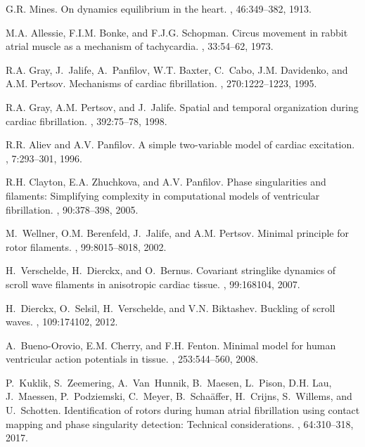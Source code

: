\documentclass{article}
\begin{document}
\begin{thebibliography}{10}

G.R. Mines.
\newblock On dynamics equilibrium in the heart.
, 46:349--382, 1913.

M.A. Allessie, F.I.M. Bonke, and F.J.G. Schopman.
\newblock Circus movement in rabbit atrial muscle as a mechanism of
  tachycardia.
, 33:54--62, 1973.

R.A. Gray, J.~Jalife, A.~Panfilov, W.T. Baxter, C.~Cabo, J.M. Davidenko, and
  A.M. Pertsov.
\newblock Mechanisms of cardiac fibrillation.
, 270:1222--1223, 1995.

R.A. Gray, A.M. Pertsov, and J.~Jalife.
\newblock Spatial and temporal organization during cardiac fibrillation.
, 392:75--78, 1998.

R.R. Aliev and A.V. Panfilov.
\newblock A simple two-variable model of cardiac excitation.
, 7:293--301, 1996.

R.H. Clayton, E.A. Zhuchkova, and A.V. Panfilov.
\newblock Phase singularities and filaments: Simplifying complexity in
  computational models of ventricular fibrillation.
, 90:378--398, 2005.

M.~Wellner, O.M. Berenfeld, J.~Jalife, and A.M. Pertsov.
\newblock Minimal principle for rotor filaments.
, 99:8015--8018, 2002.

H.~Verschelde, H.~Dierckx, and O.~Bernus.
\newblock Covariant stringlike dynamics of scroll wave filaments in anisotropic
  cardiac tissue.
, 99:168104, 2007.

H.~Dierckx, O.~Selsil, H.~Verschelde, and V.N. Biktashev.
\newblock Buckling of scroll waves.
, 109:174102, 2012.

A.~Bueno-Orovio, E.M. Cherry, and F.H. Fenton.
\newblock Minimal model for human ventricular action potentials in tissue.
, 253:544--560, 2008.

P.~Kuklik, S.~Zeemering, A.~Van~Hunnik, B.~Maesen, L.~Pison, D.H. Lau,
  J.~Maessen, P.~Podziemski, C.~Meyer, B.~Scha{\"a}ffer, H.~Crijns, S.~Willems,
  and U.~Schotten.
\newblock Identification of rotors during human atrial fibrillation using
  contact mapping and phase singularity detection: Technical considerations.
, 64:310--318, 2017.


\end{thebibliography}
\end{document}
